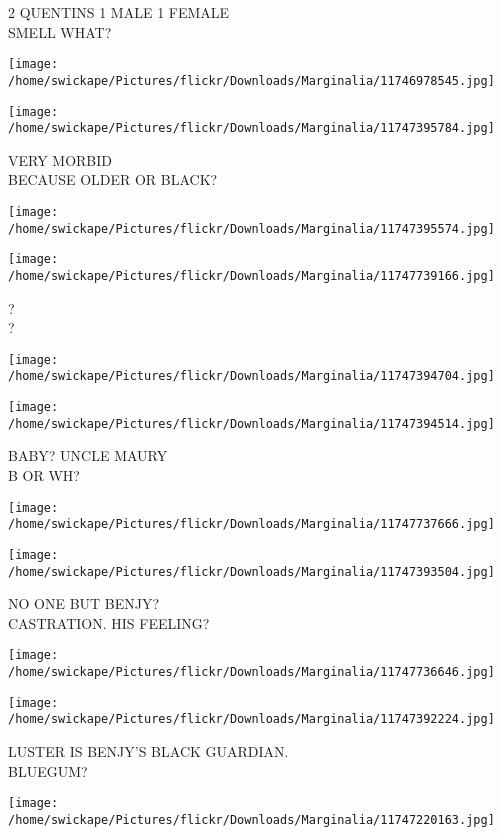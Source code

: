 \documentclass[10pt,letterpaper]{article}
\begin{document}
2 QUENTINS 1 MALE 1 FEMALE\\
SMELL WHAT?
\pagebreak

\texttt{[image: /home/swickape/Pictures/flickr/Downloads/Marginalia/11746978545.jpg]}

\vspace{0.25in}
\texttt{[image: /home/swickape/Pictures/flickr/Downloads/Marginalia/11747395784.jpg]}

VERY MORBID\\
BECAUSE OLDER OR BLACK?
\pagebreak

\texttt{[image: /home/swickape/Pictures/flickr/Downloads/Marginalia/11747395574.jpg]}

\vspace{0.25in}
\texttt{[image: /home/swickape/Pictures/flickr/Downloads/Marginalia/11747739166.jpg]}

?\\
?
\pagebreak

\texttt{[image: /home/swickape/Pictures/flickr/Downloads/Marginalia/11747394704.jpg]}

\vspace{0.25in}
\texttt{[image: /home/swickape/Pictures/flickr/Downloads/Marginalia/11747394514.jpg]}

BABY? UNCLE MAURY\\
B OR WH?
\pagebreak

\texttt{[image: /home/swickape/Pictures/flickr/Downloads/Marginalia/11747737666.jpg]}

\vspace{0.25in}
\texttt{[image: /home/swickape/Pictures/flickr/Downloads/Marginalia/11747393504.jpg]}

NO ONE BUT BENJY?\\
CASTRATION. HIS FEELING?
\pagebreak

\texttt{[image: /home/swickape/Pictures/flickr/Downloads/Marginalia/11747736646.jpg]}

\vspace{0.25in}
\texttt{[image: /home/swickape/Pictures/flickr/Downloads/Marginalia/11747392224.jpg]}

LUSTER IS BENJY'S BLACK GUARDIAN.\\
BLUEGUM?
\pagebreak

\texttt{[image: /home/swickape/Pictures/flickr/Downloads/Marginalia/11747220163.jpg]}
\end{document}
